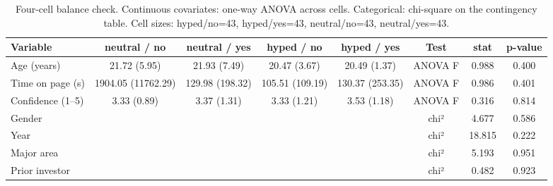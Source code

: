 \begin{table}[!htbp]
  \centering
  \begin{threeparttable}
  \caption{Four-cell balance check. Continuous covariates: one-way ANOVA across cells. Categorical: chi-square on the contingency table. Cell sizes: hyped/no=43, hyped/yes=43, neutral/no=43, neutral/yes=43.}
  \label{tab:balance4}
  \begin{tabular}{lccccccc}
\toprule
Variable & neutral / no & neutral / yes & hyped / no & hyped / yes & Test & stat & p-value \\
\midrule
Age (years) & 21.72 (5.95) & 21.93 (7.49) & 20.47 (3.67) & 20.49 (1.37) & ANOVA F & 0.988 & 0.400 \\
Time on page (s) & 1904.05 (11762.29) & 129.98 (198.32) & 105.51 (109.19) & 130.37 (253.35) & ANOVA F & 0.986 & 0.401 \\
Confidence (1–5) & 3.33 (0.89) & 3.37 (1.31) & 3.33 (1.21) & 3.53 (1.18) & ANOVA F & 0.316 & 0.814 \\
Gender &  &  &  &  & chi² & 4.677 & 0.586 \\
Year &  &  &  &  & chi² & 18.815 & 0.222 \\
Major area &  &  &  &  & chi² & 5.193 & 0.951 \\
Prior investor &  &  &  &  & chi² & 0.482 & 0.923 \\
\bottomrule
\end{tabular}
  \end{threeparttable}
\end{table}
